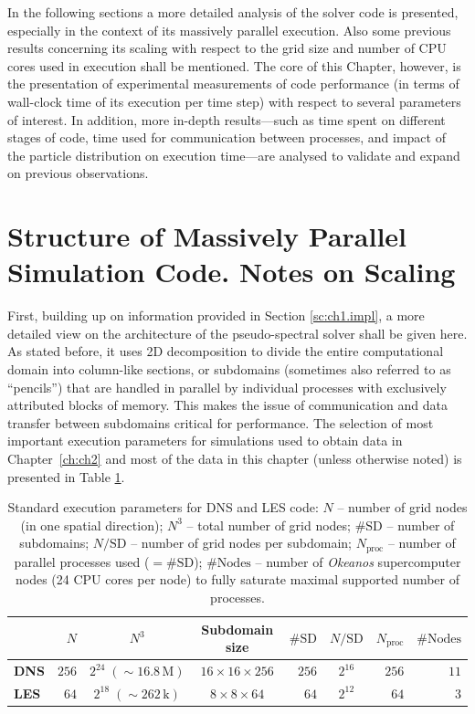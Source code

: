 \documentclass{pracamgren}
\begin{document}
In the following sections a more detailed analysis of the solver code is presented, especially in the context of its massively parallel execution.
Also some previous results concerning its scaling with respect to the grid size and number of CPU cores used in execution shall be mentioned.
The core of this Chapter, however, is the presentation of experimental measurements of code performance (in terms of wall-clock time of its execution per time step) with respect to several parameters of interest.
In addition, more in-depth results---such as time spent on different stages of code, time used for communication between processes, and impact of the particle distribution on execution time---are analysed to validate and expand on previous observations.



\section{Structure of Massively Parallel Simulation Code. Notes on Scaling}
\label{sc:ch3.perf}

First, building up on information provided in Section \ref{sc:ch1.impl}, a more detailed view on the architecture of the pseudo-spectral solver shall be given here.
As stated before, it uses 2D decomposition to divide the entire computational domain into column-like sections, or subdomains (sometimes also referred to as ``pencils'') that are handled in parallel by individual processes with exclusively attributed blocks of memory.
This makes the issue of communication and data transfer between subdomains critical for performance.
The selection of most important execution parameters for simulations used to obtain data in Chapter~\ref{ch:ch2} and most of the data in this chapter (unless otherwise noted) is presented in Table \ref{tab:perfs-params}.

\begin{table}[ht]
\centering
\scriptsize
\begin{tabular}{lrccrcrr}
 & $N$ & $N^3$ & Subdomain size & $\#\text{SD}$ & $N / \text{SD}$ & $N_{\text{proc}}$ & $\# \text{Nodes}$ \\ \hline
\textbf{DNS} & $256$ & $2^{24} \; (\sim 16.8 \, \text{M})$ & $16 \times 16 \times 256$ & $256$ & $2^{16}$ & $256$ & $11$ \\
\textbf{LES} & $64$ & $2^{18} \; (\sim 262 \, \text{k})$ & $8 \times 8 \times 64$ & $64$ & $2^{12}$ & $64$ & $3$ \\   
\end{tabular}
\caption{Standard execution parameters for DNS and LES code: $N$ -- number of grid nodes (in one spatial direction); $N^3$ -- total number of grid nodes; $\#\text{SD}$ -- number of subdomains; $N / \text{SD}$ -- number of grid nodes per subdomain; $N_{\text{proc}}$ -- number of parallel processes used ($= \#\text{SD}$); $\# \text{Nodes}$ -- number of \emph{Okeanos} supercomputer nodes (24 CPU cores per node) to fully saturate maximal supported number of processes.
}
\label{tab:perfs-params}
\end{table}
\end{document}
